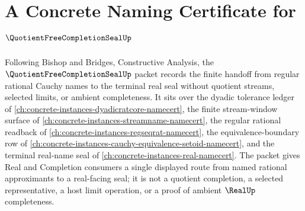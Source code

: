\chapter{A Concrete Naming Certificate for $\QuotientFreeCompletionSealUp$}
\label{ch:concrete-instances-quotient-free-completion-seal-namecert}

Following Bishop and Bridges, Constructive Analysis, the $\QuotientFreeCompletionSealUp$ packet records the finite handoff from regular rational Cauchy names to the terminal real seal without quotient streams, selected limits, or ambient completeness. It sits over the dyadic tolerance ledger of \autoref{ch:concrete-instances-dyadicratcore-namecert}, the finite stream-window surface of \autoref{ch:concrete-instances-streamname-namecert}, the regular rational readback of \autoref{ch:concrete-instances-regseqrat-namecert}, the equivalence-boundary row of \autoref{ch:concrete-instances-cauchy-equivalence-setoid-namecert}, and the terminal real-name seal of \autoref{ch:concrete-instances-real-namecert}. The packet gives Real and Completion consumers a single displayed route from named rational approximants to a real-facing seal; it is not a quotient completion, a selected representative, a host limit operation, or a proof of ambient $\RealUp$ completeness.

